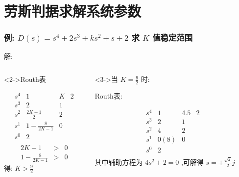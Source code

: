 \documentclass{beamer}
\begin{document}
\section{劳斯判据求解系统参数}
\label{sec-5}
\begin{frame}
\frametitle{例: $D(s)=s^{4}+2s^{3}+ks^{2}+s+2$ 求 $K$ 值稳定范围}
\label{sec-5-1}


解:
\begin{columns}
\begin{column}{0.35\textwidth}
\begin{block}<2->{Routh表}
\label{sec-5-1-1}

\[
\begin{matrix}
s^{4} & 1 & K & 2\\
s^{3} & 2 & 1 \\
s^{2} & \frac{2K-1}{2} & 2\\
s^{1} & 1-\frac{8}{2K-1} & 0 \\
s^{0} & 2 \\
\end{matrix}
\]
\begin{eqnarray*}
2K-1 & > & 0 \\
1-\frac{8}{2K-1} &>& 0  
\end{eqnarray*}
得: $K>\frac{9}{2}$
\end{block}
\end{column}
\begin{column}{0.7\textwidth}
\begin{block}<3->{当 $K=\frac{9}{2}$ 时:}
\label{sec-5-1-2}


Routh表:

$$
\begin{matrix}
s^{4} & 1 & 4.5 & 2\\
s^{3} & 2 & 1 \\
s^{2} & 4 & 2\\
s^{1} & 0(8) & 0 \\
s^{0} & 2 \\
\end{matrix}
$$
其中辅助方程为 $4s^{2}+2=0$ ,可解得 $s=\pm\frac{\sqrt{2}}{2}j$ 
\end{block}
\end{column}
\end{columns}
\end{frame}
\end{document}
